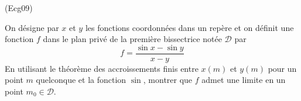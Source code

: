 \begin{tiny}(Ecg09)\end{tiny} On désigne par $x$ et $y$ les fonctions coordonnées dans un repère \repere  et on définit une fonction $f$ dans le plan privé de la première bissectrice notée $\mathcal D$ par 
\begin{displaymath}
 f=\frac{\sin x - \sin y}{x-y}
\end{displaymath}
En utilisant le théorème des accroissements finis entre $x(m)$ et $y(m)$ pour un point $m$ quelconque et la fonction $\sin$, montrer que $f$ admet une limite en un point $m_0\in \mathcal D$.